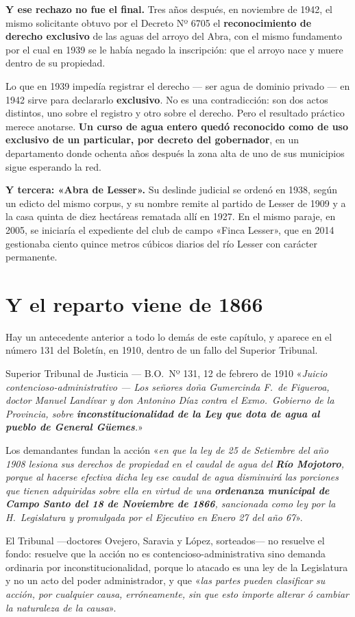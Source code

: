 \textbf{Y ese rechazo no fue el final.} Tres años después, en noviembre de 1942, el mismo
solicitante obtuvo por el Decreto Nº 6705 el \textbf{reconocimiento de derecho exclusivo} de
las aguas del arroyo del Abra, con el mismo fundamento por el cual en 1939 se le había negado
la inscripción: que el arroyo nace y muere dentro de su propiedad.

Lo que en 1939 impedía registrar el derecho --- ser agua de dominio privado --- en 1942 sirve
para declararlo \textbf{exclusivo}. No es una contradicción: son dos actos distintos, uno
sobre el registro y otro sobre el derecho. Pero el resultado práctico merece anotarse.
\textbf{Un curso de agua entero quedó reconocido como de uso exclusivo de un particular, por
decreto del gobernador}, en un departamento donde ochenta años después la zona alta de uno
de sus municipios sigue esperando la red.

\textbf{Y tercera: «Abra de Lesser».} Su deslinde judicial se ordenó en 1938, según un
edicto del mismo corpus, y su nombre remite al partido de Lesser de 1909 y a la casa quinta
de diez hectáreas rematada allí en 1927. En el mismo paraje, en 2005, se iniciaría el
expediente del club de campo «Finca Lesser», que en 2014 gestionaba ciento quince metros cúbicos diarios del río Lesser con carácter permanente.

\section{Y el reparto viene de 1866}

Hay un antecedente anterior a todo lo demás de este capítulo, y aparece en el número 131 del
Boletín, en 1910, dentro de un fallo del Superior Tribunal.

\begin{ficha}{Superior Tribunal de Justicia --- B.O.\ Nº 131, 12 de febrero de 1910}
«\textit{Juicio contencioso-administrativo --- Los señores doña Gumercinda F.\ de Figueroa,
doctor Manuel Landívar y don Antonino Díaz contra el Exmo.\ Gobierno de la Provincia, sobre
\textbf{inconstitucionalidad de la Ley que dota de agua al pueblo de General Güemes}.}»

Los demandantes fundan la acción «\textit{en que la ley de 25 de Setiembre del año 1908 lesiona
sus derechos de propiedad en el caudal de agua del \textbf{Río Mojotoro}, porque al hacerse
efectiva dicha ley ese caudal de agua disminuirá las porciones que tienen adquiridas sobre ella
en virtud de una \textbf{ordenanza municipal de Campo Santo del 18 de Noviembre de 1866},
sancionada como ley por la H.\ Legislatura y promulgada por el Ejecutivo en Enero 27 del
año 67}».

El Tribunal ---doctores Ovejero, Saravia y López, sorteados--- no resuelve el fondo: resuelve
que la acción no es contencioso-administrativa sino demanda ordinaria por inconstitucionalidad,
porque lo atacado es una ley de la Legislatura y no un acto del poder administrador, y que
«\textit{las partes pueden clasificar su acción, por cualquier causa, erróneamente, sin que esto
importe alterar ó cambiar la naturaleza de la causa}».
\end{ficha}

